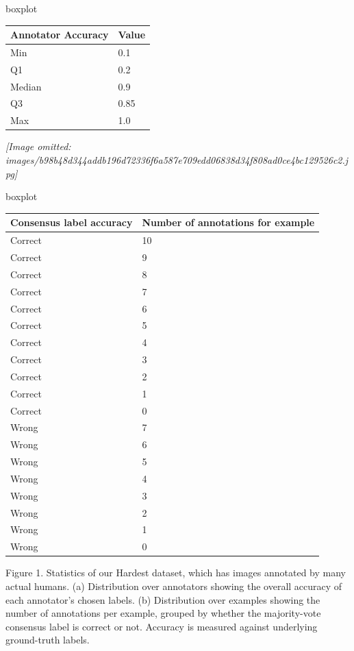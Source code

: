 \documentclass[
]{article}
\newcounter{none} %
\begin{document}
boxplot

{\def\LTcaptype{none} %
\begin{longtable}[]{@{}ll@{}}
\toprule\noalign{}
Annotator Accuracy & Value \\
\midrule\noalign{}
\endhead
\bottomrule\noalign{}
\endlastfoot
Min & 0.1 \\
Q1 & 0.2 \\
Median & 0.9 \\
Q3 & 0.85 \\
Max & 1.0 \\
\end{longtable}
}

\textit{[Image omitted: images/b98b48d344addb196d72336f6a587e709edd06838d34f808ad0ce4bc129526c2.jpg]}

boxplot

{\def\LTcaptype{none} %
\begin{longtable}[]{@{}ll@{}}
\toprule\noalign{}
Consensus label accuracy & Number of annotations for example \\
\midrule\noalign{}
\endhead
\bottomrule\noalign{}
\endlastfoot
Correct & 10 \\
Correct & 9 \\
Correct & 8 \\
Correct & 7 \\
Correct & 6 \\
Correct & 5 \\
Correct & 4 \\
Correct & 3 \\
Correct & 2 \\
Correct & 1 \\
Correct & 0 \\
Wrong & 7 \\
Wrong & 6 \\
Wrong & 5 \\
Wrong & 4 \\
Wrong & 3 \\
Wrong & 2 \\
Wrong & 1 \\
Wrong & 0 \\
\end{longtable}
}

Figure 1. Statistics of our Hardest dataset, which has images annotated
by many actual humans. (a) Distribution over annotators showing the
overall accuracy of each annotator's chosen labels. (b) Distribution
over examples showing the number of annotations per example, grouped by
whether the majority-vote consensus label is correct or not. Accuracy is
measured against underlying ground-truth labels.
\end{document}
